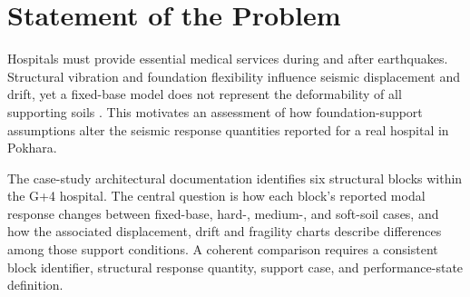 \section{Statement of the Problem}
Hospitals must provide essential medical services during and after earthquakes. Structural vibration and foundation flexibility influence seismic displacement and drift, yet a fixed-base model does not represent the deformability of all supporting soils \cite{guragain2004,subedi2022}. This motivates an assessment of how foundation-support assumptions alter the seismic response quantities reported for a real hospital in Pokhara.

The case-study architectural documentation identifies six structural blocks within the G+4 hospital. The central question is how each block's reported modal response changes between fixed-base, hard-, medium-, and soft-soil cases, and how the associated displacement, drift and fragility charts describe differences among those support conditions. A coherent comparison requires a consistent block identifier, structural response quantity, support case, and performance-state definition.
